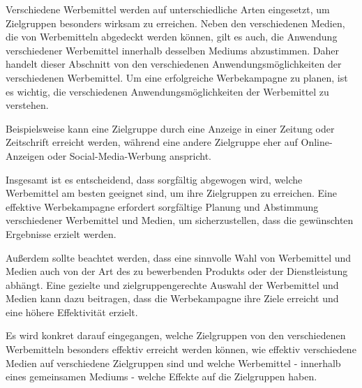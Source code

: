 \begin{refsection}
  
Verschiedene Werbemittel werden auf unterschiedliche Arten eingesetzt, um Zielgruppen besonders wirksam zu erreichen. Neben den verschiedenen Medien, die von Werbemitteln abgedeckt werden können, gilt es auch, die Anwendung verschiedener Werbemittel innerhalb desselben Mediums abzustimmen. Daher handelt dieser Abschnitt von den verschiedenen Anwendungsmöglichkeiten der verschiedenen Werbemittel. Um eine erfolgreiche Werbekampagne zu planen, ist es wichtig, die verschiedenen Anwendungsmöglichkeiten der Werbemittel zu verstehen. 

Beispielsweise kann eine Zielgruppe durch eine Anzeige in einer Zeitung oder Zeitschrift erreicht werden, während eine andere Zielgruppe eher  auf Online-Anzeigen oder Social-Media-Werbung anspricht.

Insgesamt ist es entscheidend, dass sorgfältig abgewogen wird, welche Werbemittel am besten geeignet sind, um ihre Zielgruppen zu erreichen. Eine effektive Werbekampagne erfordert sorgfältige Planung und Abstimmung verschiedener Werbemittel und Medien, um sicherzustellen, dass die gewünschten Ergebnisse erzielt werden.

Au\ss{}erdem sollte beachtet werden, dass eine sinnvolle Wahl von Werbemittel und Medien auch von der Art des zu bewerbenden Produkts oder der Dienstleistung abhängt. Eine gezielte und zielgruppengerechte Auswahl der Werbemittel und Medien kann dazu beitragen, dass die Werbekampagne ihre Ziele erreicht und eine höhere Effektivität erzielt.

Es wird konkret darauf eingegangen, welche Zielgruppen von den verschiedenen Werbemitteln besonders effektiv erreicht werden können, wie effektiv verschiedene Medien auf verschiedene Zielgruppen sind und welche Werbemittel - innerhalb eines gemeinsamen Mediums - welche Effekte auf die Zielgruppen haben.

  \clearpage
  \printbibliography[heading=subsubbibliography]
\end{refsection}
\clearpage

